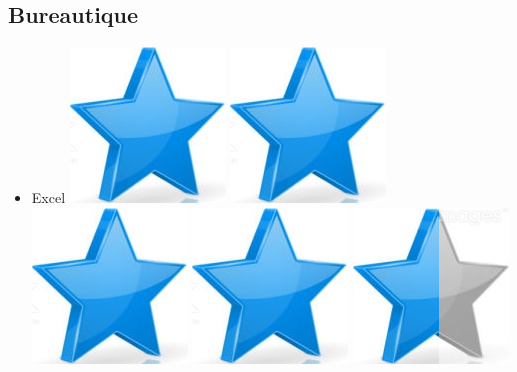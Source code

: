 \documentclass[10pt,a4paper,sans]{article}
\begin{document}
\begin{minipage}[t]{0.28\textwidth}
\begin{mdframed}[style=cadreCompetences]
        \subsection{Bureautique}
            \begin{itemize}
                \item{Excel
                    \hfill
                    \includegraphics[scale=0.25]{img/star.png} \hspace{-0.22cm}
                    \includegraphics[scale=0.25]{img/star.png} \hspace{-0.22cm}
                    \includegraphics[scale=0.25]{img/star.png} \hspace{-0.22cm}
                    \includegraphics[scale=0.25]{img/star.png} \hspace{-0.22cm}
                    \includegraphics[scale=0.25]{img/half_star.png}}

\end{itemize}
\end{mdframed}
\end{minipage}
\end{document}
